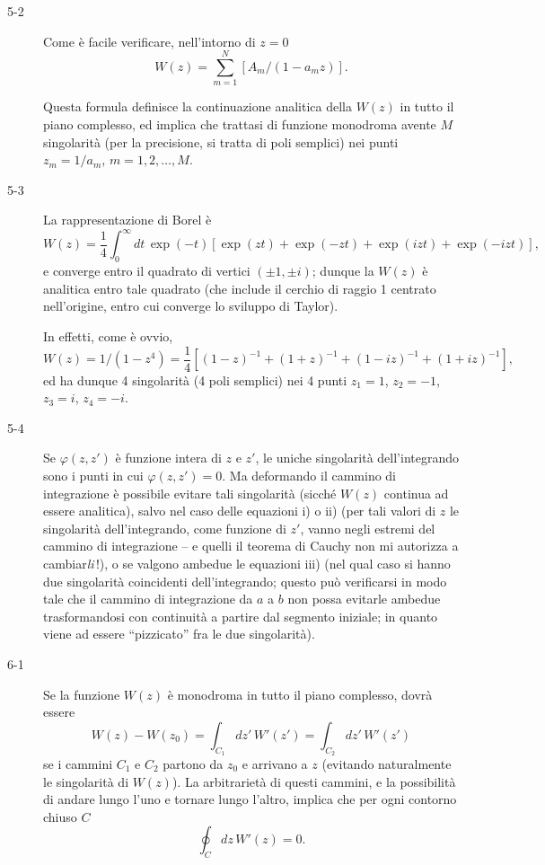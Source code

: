 \documentclass[11pt, a4paper]{book}
\numberwithin{equation}{section}
\begin{document}
\begin{description}
\item[5-2] Come è facile verificare, nell'intorno di $z=0$
$$W(z) = \sum_{m=1}^{N}\left[A_m / (1 - a_m z)\right].$$

Questa formula definisce la continuazione analitica della $W(z)$ in tutto il piano complesso, ed implica che trattasi di funzione monodroma avente $M$ singolarità (per la precisione, si tratta di poli semplici) nei punti $z_m = 1/a_m$, $m = 1, 2, \ldots, M$.

\item[5-3] La rappresentazione di Borel è
$$W(z) = \frac{1}{4}\int_0^\infty dt\, \exp(-t)\left[\exp(zt) + \exp(-zt) + \exp(izt) + \exp(-izt)\right],$$
e converge entro il quadrato di vertici $(\pm 1, \pm i)$; dunque la $W(z)$ è analitica entro tale quadrato (che include il cerchio di raggio 1 centrato nell'origine, entro cui converge lo sviluppo di Taylor).

In effetti, come è ovvio,
$$W(z) = 1/(1-z^4) = \frac{1}{4}\left[(1-z)^{-1} + (1+z)^{-1} + (1-iz)^{-1} + (1+iz)^{-1}\right],$$
ed ha dunque 4 singolarità (4 poli semplici) nei 4 punti $z_1 = 1$, $z_2 = -1$, $z_3 = i$, $z_4 = -i$.

\item[5-4] Se $\varphi(z, z')$ è funzione intera di $z$ e $z'$, le uniche singolarità dell'integrando sono i punti in cui $\varphi(z, z') = 0$. Ma deformando il cammino di integrazione è possibile evitare tali singolarità (sicché $W(z)$ continua ad essere analitica), salvo nel caso delle equazioni i) o ii) (per tali valori di $z$ le singolarità dell'integrando, come funzione di $z'$, vanno negli estremi del cammino di integrazione -- e quelli il teorema di Cauchy non mi autorizza a cambiar\emph{li}\,!), o se valgono ambedue le equazioni iii) (nel qual caso si hanno due singolarità coincidenti dell'integrando; questo può verificarsi in modo tale che il cammino di integrazione da $a$ a $b$ non possa evitarle ambedue trasformandosi con continuità a partire dal segmento iniziale; in quanto viene ad essere ``pizzicato'' fra le due singolarità).

\item[6-1] Se la funzione $W(z)$ è monodroma in tutto il piano complesso, dovrà essere
$$W(z) - W(z_0) = \int_{C_1} dz'\, W'(z') = \int_{C_2} dz'\, W'(z')$$
se i cammini $C_1$ e $C_2$ partono da $z_0$ e arrivano a $z$ (evitando naturalmente le singolarità di $W(z)$). La arbitrarietà di questi cammini, e la possibilità di andare lungo l'uno e tornare lungo l'altro, implica che per ogni contorno chiuso $C$
$$\oint_C dz\, W'(z) = 0.$$


\end{description}
\end{document}
